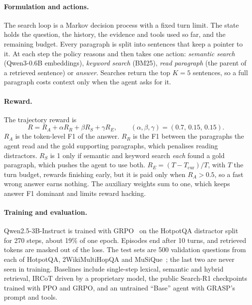 \documentclass[pdflatex,sn-mathphys-num]{sn-jnl}%
\begin{document}
\paragraph{Formulation and actions.} The search loop is a Markov decision process with a fixed turn limit. The state holds the question, the history, the evidence and tools used so far, and the remaining budget. Every paragraph is split into sentences that keep a pointer to it. At each step the policy reasons and then takes one action: \emph{semantic search} (Qwen3-0.6B embeddings), \emph{keyword search} (BM25), \emph{read paragraph} (the parent of a retrieved sentence) or \emph{answer}. Searches return the top $K=5$ sentences, so a full paragraph costs context only when the agent asks for it.

\paragraph{Reward.} The trajectory reward is
\begin{equation}
R = R_A + \alpha R_R + \beta R_S + \gamma R_E, \qquad (\alpha,\beta,\gamma) = (0.7,\, 0.15,\, 0.15).
\label{eq:grasp}
\end{equation}
$R_A$ is the token-level F1 of the answer. $R_R$ is the F1 between the paragraphs the agent read and the gold supporting paragraphs, which penalises reading distractors. $R_S$ is 1 only if semantic and keyword search \emph{each} found a gold paragraph, which pushes the agent to use both. $R_E = (T - T_{\mathrm{cur}})/T$, with $T$ the turn budget, rewards finishing early, but it is paid only when $R_A > 0.5$, so a fast wrong answer earns nothing. The auxiliary weights sum to one, which keeps answer F1 dominant and limits reward hacking.

\paragraph{Training and evaluation.} Qwen2.5-3B-Instruct is trained with GRPO~\cite{shao2024deepseekmath} on the HotpotQA distractor split~\cite{yang2018hotpotqa} for 270 steps, about 19\% of one epoch. Episodes end after 10 turns, and retrieved tokens are masked out of the loss. The test sets are 500 validation questions from each of HotpotQA, 2WikiMultiHopQA and MuSiQue~\cite{yang2018hotpotqa,ho2020twowiki,trivedi2022musique}; the last two are never seen in training. Baselines include single-step lexical, semantic and hybrid retrieval, IRCoT driven by a proprietary model, the public Search-R1 checkpoints trained with PPO and GRPO, and an untrained ``Base'' agent with GRASP's prompt and tools.
\end{document}
